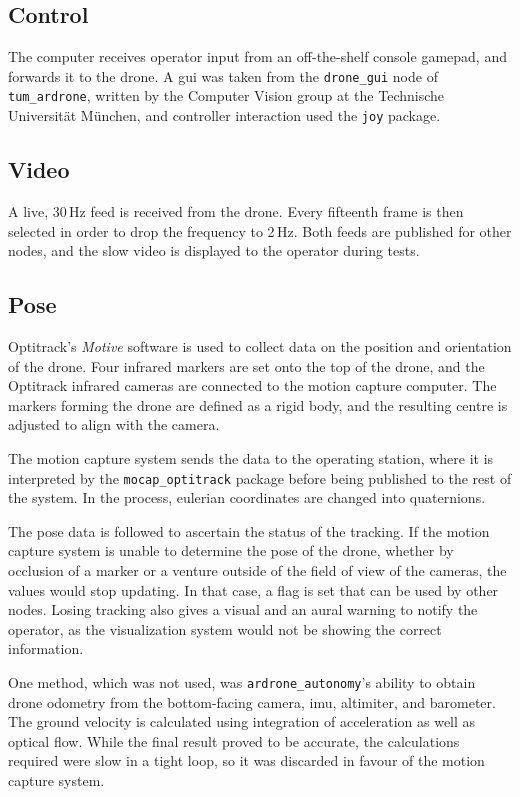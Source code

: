   \subsection{Control}
    The computer receives operator input from an off-the-shelf console gamepad, and forwards it to the drone.
    A \gls{gui} was taken from the \verb|drone_gui| node of \verb|tum_ardrone|, written by the Computer Vision group at the Technische Universität München, and controller interaction used the \verb|joy| package.

  \subsection{Video}
    A live, 30\,Hz feed is received from the drone.
    Every fifteenth frame is then selected in order to drop the frequency to 2\,Hz.
    Both feeds are published for other nodes, and the slow video is displayed to the operator during tests.

  \subsection{Pose}
    Optitrack's \emph{Motive} software is used to collect data on the position and orientation of the drone.
    Four infrared markers are set onto the top of the drone, and the Optitrack infrared cameras are connected to the motion capture computer.
    The markers forming the drone are defined as a rigid body, and the resulting centre is adjusted to align with the camera.

    The motion capture system sends the data to the operating station, where it is interpreted by the \verb|mocap_optitrack| package before being published to the rest of the system.
    In the process, eulerian coordinates are changed into quaternions.

    The pose data is followed to ascertain the status of the tracking.
    If the motion capture system is unable to determine the pose of the drone, whether by occlusion of a marker or a venture outside of the field of view of the cameras, the values would stop updating.
    In that case, a flag is set that can be used by other nodes.
    Losing tracking also gives a visual and an aural warning to notify the operator, as the visualization system would not be showing the correct information.

    One method, which was not used, was \verb|ardrone_autonomy|'s ability to obtain drone odometry from the bottom-facing camera, \gls{imu}, altimiter, and barometer.
    The ground velocity is calculated using integration of acceleration as well as optical flow.
    While the final result proved to be accurate, the calculations required were slow in a tight loop, so it was discarded in favour of the motion capture system.

